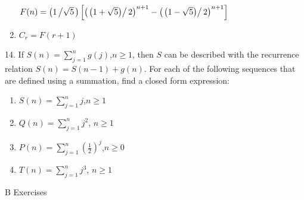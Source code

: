 \documentclass[10pt,]{book}
\theoremstyle{plain}
\theoremstyle{definition}
\theoremstyle{definition}
\theoremstyle{definition}
\theoremstyle{definition}
\numberwithin{equation}{section}
\begin{document}
\begin{exercisegroup}
\begin{enumerate}[label=\alph*]
\(F(n)=\left(1\left/\sqrt{5}\right.\right)\left[\left(\left.\left(1+\sqrt{5}\right)\right/2\right)^{n+1}-\left(\left.\left(1-\sqrt{5}\right)\right/2\right)^{n+1}\right]\)%
\item\hypertarget{li-77}{} \(C_r=F(r+1)\)%
\end{enumerate}
%
\item[14.]\hypertarget{exercise-25}{}If \(S(n)=\sum_{j=1}^n g(j)\),\(n\geq 1\), then \(S\) can be described with the recurrence relation \(S(n) = S(n-1) + g(n)\). For
each of the following sequences that are defined using a summation, find a closed form expression:%
\par
\leavevmode%
\begin{enumerate}[label=\alph*]
\item\hypertarget{li-78}{} \(S(n) =\sum_{j=1}^n j\),\(n\geq 1\)%
\item\hypertarget{li-79}{}\(Q(n) = \sum_{j=1}^n j^2\), \(n\geq 1\)%
\item\hypertarget{li-80}{}\(P(n) =\)\(\sum_{j=1}^n \left(\frac{1}{2}\right)^j\),\(n\geq 0\)%
\item\hypertarget{li-81}{} \(T(n)= \sum_{j=1}^n j^3\), \(n\geq 1\)%
\end{enumerate}
%
\par\smallskip
\end{exercisegroup}
\par\smallskip\noindent
\hypertarget{exercisegroup-6}{}\typeout{************************************************}
\typeout{************************************************}
B Exercises%
\end{document}
